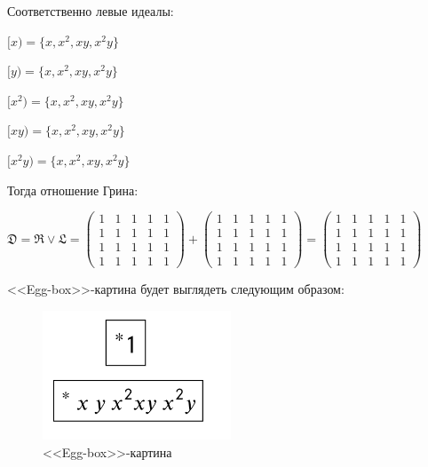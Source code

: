 \documentclass[bachelor, och, labwork]{shiza}
\begin{document}
      Соответственно левые идеалы:


      \begin{center}

        $[x) = \{x, x^2, xy, x^2y\}$

        $[y) = \{x, x^2, xy, x^2y\}$
  
        $[x^2) = \{x, x^2, xy, x^2y\}$
  
        $[xy) = \{x, x^2, xy, x^2y\}$
    
        $[x^2y) = \{x, x^2, xy, x^2y\}$

      \end{center}

      Тогда отношение Грина: 

      $\mathfrak{D} = \mathfrak{R} \vee \mathfrak{L} =
      \begin{pmatrix}
        1 & 1 & 1 & 1 & 1 \\
        1 & 1 & 1 & 1 & 1 \\
        1 & 1 & 1 & 1 & 1 \\
        1 & 1 & 1 & 1 & 1
      \end{pmatrix} +
      \begin{pmatrix}
        1 & 1 & 1 & 1 & 1 \\
        1 & 1 & 1 & 1 & 1 \\
        1 & 1 & 1 & 1 & 1 \\
        1 & 1 & 1 & 1 & 1
      \end{pmatrix} =
      \begin{pmatrix}
        1 & 1 & 1 & 1 & 1 \\
        1 & 1 & 1 & 1 & 1 \\
        1 & 1 & 1 & 1 & 1 \\
        1 & 1 & 1 & 1 & 1
      \end{pmatrix}$

      <<Egg-box>>-картина будет выглядеть следующим образом:

      \begin{figure}[H]
        \centering
        \includegraphics[width=0.5\textwidth]{photo/egg-box2.png}
        \caption{<<Egg-box>>-картина}
      \end{figure}
\end{document}
